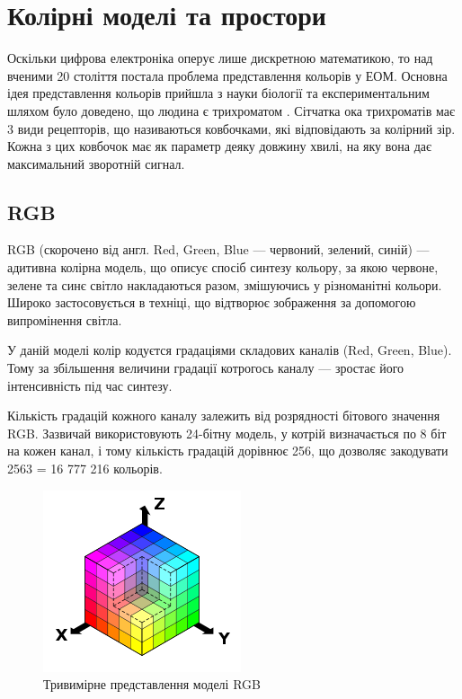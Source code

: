\section{Колірні моделі та простори}

Оскільки цифрова електроніка оперує лише дискретною математикою, то над вченими 20 століття постала проблема представлення кольорів у ЕОМ. Основна ідея представлення кольорів прийшла з науки біології та експериментальним шляхом було доведено, що людина є трихроматом \cite{ColorSeing}. Сітчатка ока трихроматів має 3 види рецепторів, що називаються ковбочками, які відповідають за колірний зір. Кожна з цих ковбочок має як параметр деяку довжину хвилі, на яку вона дає максимальний зворотній сигнал.

\subsection{RGB}
RGB (скорочено від англ. Red, Green, Blue — червоний, зелений, синій) — адитивна колірна модель, що описує спосіб синтезу кольору, за якою червоне, зелене та синє світло накладаються разом, змішуючись у різноманітні кольори. Широко застосовується в техніці, що відтворює зображення за допомогою випромінення світла.

У даній моделі колір кодуєтся градаціями складових каналів (Red, Green, Blue). Тому за збільшення величини градації котрогось каналу — зростає його інтенсивність під час синтезу.

Кількість градацій кожного каналу залежить від розрядності бітового значення RGB. Зазвичай використовують 24-бітну модель, у котрій визначається по 8 біт на кожен канал, і тому кількість градацій дорівнює 256, що дозволяє закодувати 2563 = 16 777 216  кольорів.

\begin{figure}[H]
	\centering
	\includegraphics[width=0.7\linewidth]{theory/img/rgb_representation}
	\caption{Тривимірне представлення моделі RGB}
\end{figure}

